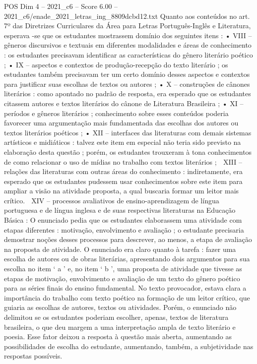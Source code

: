 \begin{textsample}{POS Dim 4 – 2021\_c6 – Score 6.00 – 2021\_c6/enade\_2021\_letras\_ing\_8809dcbd12.txt}
Quanto aos conteúdos no art. 7º das Diretrizes Curriculares da Área para Letras Português-Inglês e Literatura, esperava -se que os estudantes mostrassem domínio dos seguintes itens : • VIII – gêneros discursivos e textuais em diferentes modalidades e áreas de conhecimento : os estudantes precisavam identificar as características do gênero literário poético ; • IX – aspectos e contextos de produção-recepção do texto literário ; os estudantes também precisavam ter um certo domínio desses aspectos e contextos para justificar suas escolhas de textos ou autores ; • X – construções de cânones literários : como apontado no padrão de resposta, era esperado que os estudantes citassem autores e textos literários do cânone de Literatura Brasileira ; • XI – períodos e gêneros literários ; conhecimento sobre esses conteúdos poderia favorecer uma argumentação mais fundamentada das escolhas dos autores ou textos literários poéticos ; • XII – interfaces das literaturas com demais sistemas artísticos e midiáticos : talvez este item em especial não teria sido previsto na elaboração desta questão ; porém, os estudantes trouxeram à tona conhecimentos de como relacionar o uso de mídias no trabalho com textos literários ;  XIII – relações das literaturas com outras áreas do conhecimento : indiretamente, era esperado que os estudantes pudessem usar conhecimentos sobre este item para ampliar a visão na atividade proposta, a qual buscaria formar um leitor mais crítico.  XIV – processos avaliativos de ensino-aprendizagem de língua portuguesa e de língua inglesa e de suas respectivas literaturas na Educação Básica : O enunciado pedia que os estudantes elaborassem uma atividade com etapas diferentes : motivação, envolvimento e avaliação ; o estudante precisaria demostrar noções desses processos para descrever, ao menos, a etapa de avaliação na proposta de atividade.
O enunciado era claro quanto à tarefa : fazer uma escolha de autores ou de obras literárias, apresentando dois argumentos para sua escolha no item ‘ a ’ e, no item ‘ b ’, uma proposta de atividade que tivesse as etapas de motivação, envolvimento e avaliação de um texto do gênero poético para as séries finais do ensino fundamental.
No texto provocador, estava clara a importância do trabalho com texto poético na formação de um leitor crítico, que guiaria as escolhas de autores, textos ou atividades.
Porém, o enunciado não delimitou se os estudantes poderiam escolher, apenas, textos de literatura brasileira, o que deu margem a uma interpretação ampla de texto literário e poesia.
Esse fator deixou a resposta à questão mais aberta, aumentando as possibilidades de escolha do estudante, aumentando, também, a subjetividade nas respostas possíveis.

\end{textsample}

